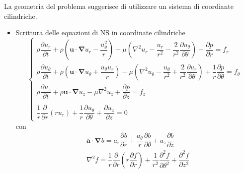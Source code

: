 \parttwo La geometria del problema suggerisce di utilizzare un sistema di coordiante cilindriche.

\begin{itemize}
  \item Scrittura delle equazioni di NS in coordinate cilindriche
  \begin{equation}
  \begin{cases}
    \rho \dfrac{\partial u_r}{\partial t}
    + \rho \left( \bm{u} \cdot \bm{\nabla}u_r - \dfrac{u_\theta^2}{r} \right)
    - \mu \left(\nabla^2 u_r 
       - \dfrac{u_r}{r^2} 
       - \dfrac{2}{r^2}\dfrac{\partial u_\theta}{\partial \theta} \right)  
       + \dfrac{\partial p}{\partial r} = f_r \\
    \rho \dfrac{\partial u_\theta}{\partial t}
    + \rho \left( \bm{u} \cdot \bm{\nabla} u_\theta + \dfrac{u_\theta u_r}{r} \right)
    - \mu \left(\nabla^2 u_\theta 
       - \dfrac{u_\theta}{r^2} 
       + \dfrac{2}{r^2}\dfrac{\partial u_r}{\partial \theta}  \right) 
    + \dfrac{1}{r} \dfrac{\partial p}{\partial \theta} = f_\theta\\
    \rho \dfrac{\partial u_z}{\partial t}
    + \rho \bm{u} \cdot \bm{\nabla} u_z
    - \mu \nabla^2 u_z
    + \dfrac{\partial p}{\partial z} = f_z \\ \\
    \dfrac{1}{r}\dfrac{\partial}{\partial r}\left( r u_r \right) 
    + \dfrac{1}{r}\dfrac{\partial u_\theta}{\partial \theta} 
    + \dfrac{\partial u_z}{\partial z} = 0
  \end{cases}
  \end{equation}
  con 
  \begin{equation}
  \begin{aligned}
  & \bm{a} \cdot \bm{\nabla} b = a_r \dfrac{\partial b}{\partial r} 
     + \dfrac{a_\theta}{r} \dfrac{\partial b}{\partial \theta}  
     + a_z \dfrac{\partial b}{\partial z} \\
  & \nabla^2 f = \dfrac{1}{r}\dfrac{\partial}{\partial r}
                      \left(r \dfrac{\partial f}{\partial r} \right) +
               \dfrac{1}{r^2} \dfrac{\partial^2 f}{\partial \theta^2} + 
               \dfrac{\partial^2 f}{\partial z^2} 
  \end{aligned}
  \end{equation}
  

\end{itemize}
